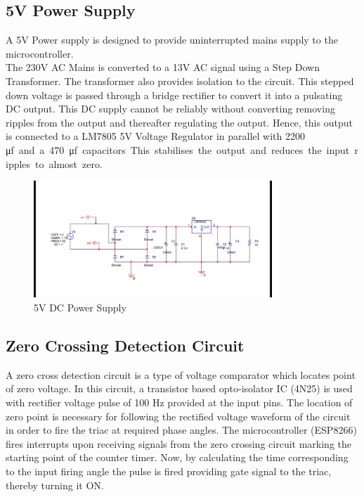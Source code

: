         \subsection{5V Power Supply}
        A 5V Power supply is designed to provide uninterrupted mains supply to the microcontroller.\\
        The 230V AC Mains is converted to a 13V AC signal using a Step Down Transformer. The transformer also provides isolation to the circuit. This stepped down voltage is passed through a bridge rectifier to convert it into a pulsating DC output. This DC supply cannot be reliably without converting removing ripples from the output and thereafter regulating the output. Hence, this output is connected to a LM7805 5V Voltage Regulator in parallel with 2200 \si\micro f and a 470 \si\micro f capacitors. This stabilises the output and reduces the input ripples to almost zero.
        
        \begin{figure}[h!]
        	\centering        	\includegraphics[width=0.8\textwidth]{photos/ckt-dgm/5VDCPowerSupply.jpg}
        	\caption{5V DC Power Supply}
        \end{figure}
    
    	\subsection{Zero Crossing Detection Circuit}
    	A zero cross detection circuit is a type of voltage comparator which locates point of zero voltage. In this circuit, a transistor based opto-isolator IC (4N25) is used with rectifier voltage pulse of 100 Hz provided at the input pins. The location of zero point is necessary for following the rectified voltage waveform of the circuit in order to fire the triac at required phase angles. The microcontroller (ESP8266) fires interrupts upon receiving signals from the zero crossing circuit marking the starting point of the counter timer. Now, by calculating the time corresponding to the input firing angle the pulse is fired providing gate signal to the triac, thereby turning it ON.
        
